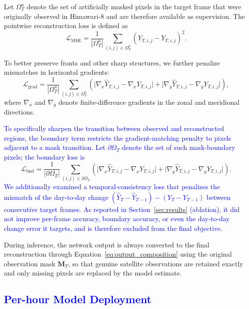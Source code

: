 \documentclass[12pt,reqno]{amsart}
\def\tb{\textcolor{blue}}
\begin{document}
Let $\Omega_T^{a}$ denote the set of artificially masked pixels in the target frame that were originally observed in Himawari-8 and are therefore available as supervision. The pointwise reconstruction loss is defined as
\begin{equation}
\mathcal{L}_{\mathrm{MSE}} =
\frac{1}{|\Omega_T^{a}|}
\sum_{(i,j)\in\Omega_T^{a}}
\left(\hat{Y}_{T,i,j}-Y_{T,i,j}\right)^2.
\end{equation}

To better preserve fronts and other sharp structures, we further penalize mismatches in horizontal gradients:
\begin{equation}
\mathcal{L}_{\mathrm{grad}} =
\frac{1}{|\Omega_T^{a}|}
\sum_{(i,j)\in\Omega_T^{a}}
\left(
\bigl|\nabla_x\hat{Y}_{T,i,j}-\nabla_x Y_{T,i,j}\bigr|
+
\bigl|\nabla_y\hat{Y}_{T,i,j}-\nabla_y Y_{T,i,j}\bigr|
\right),
\end{equation}
where $\nabla_x$ and $\nabla_y$ denote finite-difference gradients in the zonal and meridional directions.

\tb{To specifically sharpen the transition between observed and reconstructed
regions, the boundary term restricts the gradient-matching penalty to pixels
adjacent to a mask transition. Let $\partial\Omega_T$ denote the set of such
mask-boundary pixels; the boundary loss is}
\begin{equation}
\mathcal{L}_{\mathrm{bnd}}=
\frac{1}{|\partial\Omega_T|}
\sum_{(i,j)\in\partial\Omega_T}
\!\left(\bigl|\nabla_x\hat{Y}_{T,i,j}-\nabla_x Y_{T,i,j}\bigr|
       +\bigl|\nabla_y\hat{Y}_{T,i,j}-\nabla_y Y_{T,i,j}\bigr|\right).
\end{equation}
\tb{We additionally examined a temporal-consistency loss that penalizes the
mismatch of the day-to-day change $(\hat{Y}_{T}-\hat{Y}_{T-1})-(Y_{T}-Y_{T-1})$
between consecutive target frames. As reported in Section~\ref{sec:results}
(ablation), it did not improve per-frame accuracy, boundary accuracy, or even
the day-to-day change error it targets, and is therefore excluded from the final
objective.}

During inference, the network output is always converted to the final reconstruction through Equation~\eqref{eq:output_composition} using the original observation mask $\mathbf{M}_T$, so that genuine satellite observations are retained exactly and only missing pixels are replaced by the model estimate.

\subsection{\tb{Per-hour Model Deployment}}
\label{sec:deploy}
\end{document}
